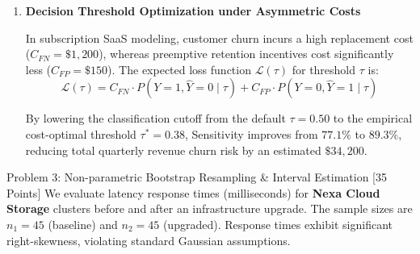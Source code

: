 \documentclass[11pt,a4paper]{scrartcl}
\begin{document}
\begin{enumerate}
  \item \textbf{Decision Threshold Optimization under Asymmetric Costs}

  In subscription SaaS modeling, customer churn incurs a high replacement cost ($C_{FN} = \$1,200$), whereas preemptive retention incentives cost significantly less ($C_{FP} = \$150$). The expected loss function $\mathcal{L}(\tau)$ for threshold $\tau$ is:
  \begin{equation}
    \mathcal{L}(\tau) = C_{FN} \cdot P(Y=1, \hat{Y}=0 \mid \tau) + C_{FP} \cdot P(Y=0, \hat{Y}=1 \mid \tau)
  \end{equation}

  By lowering the classification cutoff from the default $\tau = 0.50$ to the empirical cost-optimal threshold $\tau^* = 0.38$, Sensitivity improves from $77.1\%$ to $89.3\%$, reducing total quarterly revenue churn risk by an estimated $\$34,200$.
\end{enumerate}

\clearpage

\begin{problembox}{Problem 3: Non-parametric Bootstrap Resampling \& Interval Estimation [35 Points]}
We evaluate latency response times (milliseconds) for \textbf{Nexa Cloud Storage} clusters before and after an infrastructure upgrade. The sample sizes are $n_1 = 45$ (baseline) and $n_2 = 45$ (upgraded). Response times exhibit significant right-skewness, violating standard Gaussian assumptions.
\end{problembox}
\end{document}
